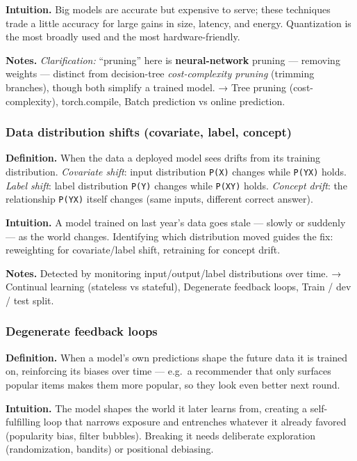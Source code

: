 \documentclass[
  10pt,
  letterpaper,
  onecolumn]{article}
\begin{document}
\textbf{Intuition.} Big models are accurate but expensive to serve;
these techniques trade a little accuracy for large gains in size,
latency, and energy. Quantization is the most broadly used and the most
hardware-friendly.

\textbf{Notes.} \emph{Clarification:} ``pruning'' here is
\textbf{neural-network} pruning --- removing weights --- distinct from
decision-tree \emph{cost-complexity pruning} (trimming branches), though
both simplify a trained model. → Tree pruning (cost-complexity),
torch.compile, Batch prediction vs online prediction.

\hypertarget{data-distribution-shifts-covariate-label-concept}{%
\subsubsection{Data distribution shifts (covariate, label,
concept)}\label{data-distribution-shifts-covariate-label-concept}}

\textbf{Definition.} When the data a deployed model sees drifts from its
training distribution. \emph{Covariate shift}: input distribution
\texttt{P(X)} changes while \texttt{P(Y\textbar{}X)} holds. \emph{Label
shift}: label distribution \texttt{P(Y)} changes while
\texttt{P(X\textbar{}Y)} holds. \emph{Concept drift}: the relationship
\texttt{P(Y\textbar{}X)} itself changes (same inputs, different correct
answer).

\textbf{Intuition.} A model trained on last year's data goes stale ---
slowly or suddenly --- as the world changes. Identifying which
distribution moved guides the fix: reweighting for covariate/label
shift, retraining for concept drift.

\textbf{Notes.} Detected by monitoring input/output/label distributions
over time. → Continual learning (stateless vs stateful), Degenerate
feedback loops, Train / dev / test split.

\hypertarget{degenerate-feedback-loops}{%
\subsubsection{Degenerate feedback
loops}\label{degenerate-feedback-loops}}

\textbf{Definition.} When a model's own predictions shape the future
data it is trained on, reinforcing its biases over time --- e.g.~a
recommender that only surfaces popular items makes them more popular, so
they look even better next round.

\textbf{Intuition.} The model shapes the world it later learns from,
creating a self-fulfilling loop that narrows exposure and entrenches
whatever it already favored (popularity bias, filter bubbles). Breaking
it needs deliberate exploration (randomization, bandits) or positional
debiasing.
\end{document}
